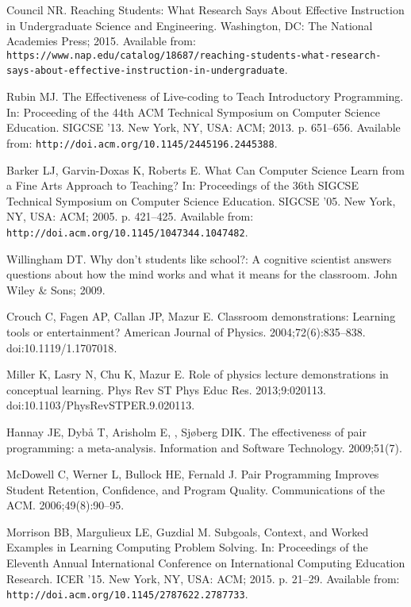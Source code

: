 \documentclass[10pt,letterpaper]{article}
\newcommand{\url}[1]{\texttt{#1}}
\begin{document}
\begin{thebibliography}{10}
Council NR.
\newblock Reaching Students: What Research Says About Effective Instruction in
  Undergraduate Science and Engineering.
\newblock Washington, DC: The National Academies Press; 2015.
\newblock Available from:
  \url{https://www.nap.edu/catalog/18687/reaching-students-what-research-says-about-effective-instruction-in-undergraduate}.

Rubin MJ.
\newblock The Effectiveness of Live-coding to Teach Introductory Programming.
\newblock In: Proceeding of the 44th ACM Technical Symposium on Computer
  Science Education. SIGCSE '13. New York, NY, USA: ACM; 2013. p. 651--656.
\newblock Available from: \url{http://doi.acm.org/10.1145/2445196.2445388}.

Barker LJ, Garvin-Doxas K, Roberts E.
\newblock What Can Computer Science Learn from a Fine Arts Approach to
  Teaching?
\newblock In: Proceedings of the 36th SIGCSE Technical Symposium on Computer
  Science Education. SIGCSE '05. New York, NY, USA: ACM; 2005. p. 421--425.
\newblock Available from: \url{http://doi.acm.org/10.1145/1047344.1047482}.

Willingham DT.
\newblock Why don't students like school?: A cognitive scientist answers
  questions about how the mind works and what it means for the classroom.
\newblock John Wiley \& Sons; 2009.

Crouch C, Fagen AP, Callan JP, Mazur E.
\newblock Classroom demonstrations: Learning tools or entertainment?
\newblock American Journal of Physics. 2004;72(6):835--838.
\newblock doi:{10.1119/1.1707018}.

Miller K, Lasry N, Chu K, Mazur E.
\newblock Role of physics lecture demonstrations in conceptual learning.
\newblock Phys Rev ST Phys Educ Res. 2013;9:020113.
\newblock doi:{10.1103/PhysRevSTPER.9.020113}.

Hannay JE, Dybå T, Arisholm E, , Sjøberg DIK.
\newblock The effectiveness of pair programming: a meta-analysis.
\newblock Information and Software Technology. 2009;51(7).

McDowell C, Werner L, Bullock HE, Fernald J.
\newblock Pair Programming Improves Student Retention, Confidence, and Program
  Quality.
\newblock Communications of the ACM. 2006;49(8):90--95.

Morrison BB, Margulieux LE, Guzdial M.
\newblock Subgoals, Context, and Worked Examples in Learning Computing Problem
  Solving.
\newblock In: Proceedings of the Eleventh Annual International Conference on
  International Computing Education Research. ICER '15. New York, NY, USA: ACM;
  2015. p. 21--29.
\newblock Available from: \url{http://doi.acm.org/10.1145/2787622.2787733}.


\end{thebibliography}
\end{document}
